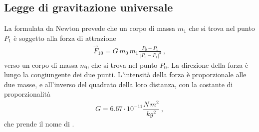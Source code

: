 \documentclass[letterpaper,10pt,italian]{jupyterBook}
\begin{document}
\subsection{Legge di gravitazione universale}
\label{\detokenize{ch/mechanics/dynamics-motion-gravitation:legge-di-gravitazione-universale}}\label{\detokenize{ch/mechanics/dynamics-motion-gravitation:physics-hs-mechanics-dynamics-motion-gravitation-newton}}
\sphinxAtStartPar
La  formulata da Newton prevede che un corpo di massa \(m_1\) che si trova nel punto \(P_1\) è soggetto alla forza di attrazione
\begin{equation*}
\begin{split}\vec{F}_{10} = G \, m_0 \, m_1 \frac{P_0 - P_1}{\ \left| P_0 - P_1 \right|^3} \ ,\end{split}
\end{equation*}
\sphinxAtStartPar
verso un corpo di massa \(m_0\) che si trova nel punto \(P_0\). La direzione della forza è lungo la congiungente dei due punti. L’intensità della forza è proporzionale alle due masse, e all’inverso del quadrato della loro distanza, con la costante di proporzionalità
\begin{equation*}
\begin{split}G = 6.67 \cdot 10^{-11} \dfrac{N \, m^2}{kg^2} \ ,\end{split}
\end{equation*}
\sphinxAtStartPar
che prende il nome di .
\end{document}
